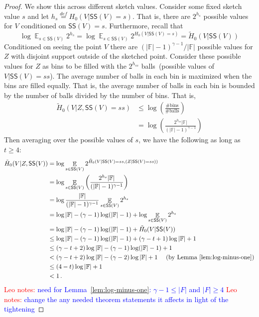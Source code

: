 \documentclass[11pt]{article}
\newcommand{\lemref}[1]{\mbox{Lemma~\ref{#1}}}
\DeclareMathOperator*{\expe}{\mathbb{E}}
\newcommand{\class}[1]{{\ensuremath{\mathsf{#1}}}}
\newcommand{\sketch}{\ensuremath{\class{SS}}\xspace}
\newcommand{\authnote}[2]{{\textcolor{red}{\textsf{#1 notes: }\textcolor{blue}{ #2}}\marginpar{\textcolor{red}{\textbf{!!!!!}}}}}
\newcommand{\authnote}[2]{}
\newcommand{\lnote}[1]{{\authnote{Leo}{#1}}}
\begin{document}
\begin{proof}
We show this across different sketch values.  Consider some fixed sketch value $s$ and let $h_s \overset{def}= H_0(V | \sketch(V) = s)$.  That is, there are $2^{h_s}$ possible values for $V$ conditioned on $\sketch(V) = s$.  Furthermore, recall that 
\[
\log \expe_{s\in \sketch(V)} 2^{h_s} = \log \expe_{s\in \sketch(V)} 2^{H_0(V | \sketch(V) = s)}  = \tilde{H}_0(V | \sketch(V)) %
\]  
Conditioned on seeing the point $V$ there are $(|\mathbb{F}|-1)^{\gamma-1}/|\mathbb{F}|$ possible values for $Z$ with disjoint support outside of the sketched point.  Consider these possible values for $Z$ as bins to be filled with the $2^{h_{ss}}$ balls~(possible values of $V | \sketch(V)=ss$).  The average number of balls in each bin is maximized when the bins are filled equally.  That is, the average number of balls in each bin is bounded by the number of balls divided by the number of bins.  That is, 
\begin{align*}
\tilde{H}_0(V |Z  , \sketch(V) = ss) &\le \log \left(\frac{\text{\# bins}}{\text{\# balls}}\right)\\
&= \log \left(\frac{2^{h_{ss}}|\mathbb{F}|}{(|\mathbb{F}|-1)^{\gamma-1}} \right)
\end{align*}
Then averaging over the possible values of $s$, we have the following as long as $t\ge 4$:
\begin{align*}
\tilde{H}_0(V |Z , \sketch(V) ) &= \log \expe_{s\in \sketch(V)} 2^{\tilde{H}_0(V |  \sketch(V) =ss , (Z| \sketch(V) =ss) )}\\
&= \log\expe_{s\in \sketch(V)} \left(\frac{2^{h_s}|\mathbb{F}|}{(|\mathbb{F}|-1)^{\gamma-1}} \right)\\
&= \log \frac{|\mathbb{F}|}{(|\mathbb{F}|-1)^{\gamma-1}} \expe_{s\in \sketch(V)} 2^{h_s}\\
&=\log |\mathbb{F}| - (\gamma -1)\log (|\mathbb{F}|-1) + \log \expe_{s\in \sketch(V)} 2^{h_s}\\
&=\log |\mathbb{F}| - (\gamma -1)\log (|\mathbb{F}|-1) + \tilde{H}_0(V | \sketch(V))\\ 
&\le \log |\mathbb{F}| - (\gamma -1)\log (|\mathbb{F}|-1) + (\gamma-t+1)\log |\mathbb{F}|+1\\
&\le (\gamma-t+2)\log |\mathbb{F}| - (\gamma-1) \log (|\mathbb{F}|-1)+1\\
&< (\gamma-t+2)\log |\mathbb{F}| - (\gamma-2) \log |\mathbb{F}| +1 \ \ \ \ \mbox{(by \lemref{lem:log-minus-one})}\\
&\le (4-t)\log |\mathbb{F}| +1\\
& <1\,.
\end{align*}
\lnote{need for \lemref{lem:log-minus-one}:  $\gamma-1\le |F|$ and $|F|\ge 4$}
\lnote{change the any needed theorem statements it affects in light of the tightening}


\end{proof}
\end{document}
